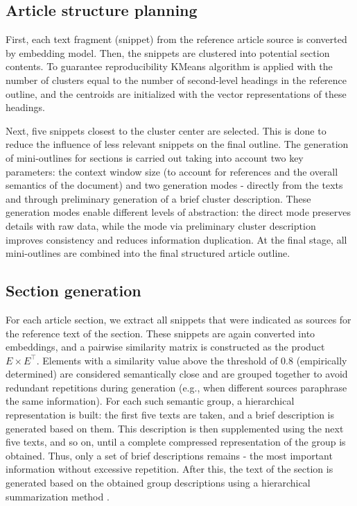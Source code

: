 \documentclass{superfri}
\begin{document}
\subsection{Article structure planning}
First, each text fragment (snippet) from the reference article source is converted by embedding model.
Then, the snippets are clustered into potential section contents.
To guarantee reproducibility KMeans algorithm is applied with the number of clusters equal to the number of second-level headings in the reference outline, and the centroids are initialized with the vector representations of these headings.

Next, five snippets closest to the cluster center are selected. This is done to reduce the influence of less relevant snippets on the final outline.
The generation of mini-outlines for sections is carried out taking into account two key parameters:
the context window size (to account for references and the overall semantics of the document) and two generation modes - directly from the texts and through preliminary generation of a brief cluster description.
These generation modes enable different levels of abstraction:
the direct mode preserves details with raw data, while the mode via preliminary cluster description
improves consistency and reduces information duplication.
At the final stage, all mini-outlines are combined into the final structured article outline.

\subsection{Section generation}
For each article section, we extract all snippets that were indicated as sources for the reference text of the section.
These snippets are again converted into embeddings, and a pairwise similarity matrix is constructed as the product \(E \times E^\top\).
Elements with a similarity value above the threshold of 0.8 (empirically determined) are considered semantically close and are grouped together to avoid redundant repetitions during generation (e.g., when different sources paraphrase the same information).
For each such semantic group, a hierarchical representation is built: the first five texts are taken, and a brief description is generated based on them.
This description is then supplemented using the next five texts, and so on, until a complete compressed representation of the group is obtained.
Thus, only a set of brief descriptions remains - the most important information without excessive repetition.
After this, the text of the section is generated based on the obtained group descriptions using a hierarchical summarization method \cite{hier}.
\end{document}
